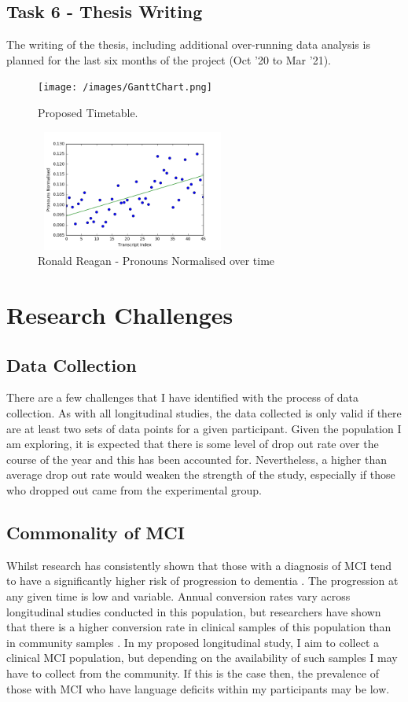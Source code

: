 \documentclass[10pt, letterpaper, twoside, openany]{book}
\begin{document}
\subsection{Task 6 - Thesis Writing}
The writing of the thesis, including additional over-running data analysis is planned for the last six months of the project (Oct '20 to Mar '21).

\begin{figure}
    \texttt{[image: /images/GanttChart.png]}
    \caption{Proposed Timetable.}
\end{figure}

\begin{figure}[H]
	\centering
	\includegraphics[width=240px, height=150px]{images/RRPronouns.png}
	\caption{Ronald Reagan - Pronouns Normalised over time}
\end{figure}

\section{Research Challenges}
\subsection{Data Collection}
There are a few challenges that I have identified with the process of data collection. As with all longitudinal studies, the data collected is only valid if there are at least two sets of data points for a given participant. Given the population I am exploring, it is expected that there is some level of drop out rate over the course of the year and this has been accounted for.  Nevertheless, a higher than average drop out rate would weaken the strength of the study, especially if those who dropped out came from the experimental group.
\subsection{Commonality of MCI}
Whilst research has consistently shown that those with a diagnosis of MCI tend to have a significantly higher risk of progression to dementia \cite{Roberts2014}. The progression at any given time is low and variable. Annual conversion rates vary across longitudinal studies conducted in this population, but researchers have shown that there is a higher conversion rate in clinical samples of this population than in community samples \cite{Farias2009}. In my proposed longitudinal study, I aim to collect a clinical MCI population, but depending on the availability of such samples I may have to collect from the community. If this is the case then, the prevalence of those with MCI who have language deficits within my participants may be low.
\end{document}
